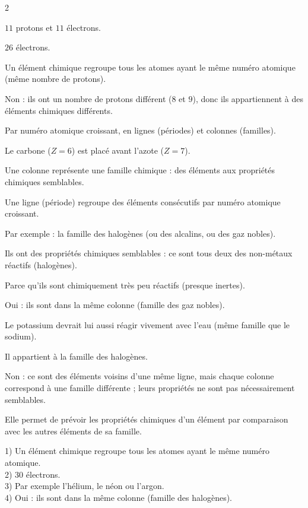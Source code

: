 \begin{multicols}{2}

$11$ protons et $11$ électrons.

$26$ électrons.

Un élément chimique regroupe tous les atomes ayant le même numéro atomique (même nombre
de protons).

Non : ils ont un nombre de protons différent ($8$ et $9$), donc ils appartiennent à des
éléments chimiques différents.

Par numéro atomique croissant, en lignes (périodes) et colonnes (familles).

Le carbone ($Z=6$) est placé avant l'azote ($Z=7$).

Une colonne représente une famille chimique : des éléments aux propriétés chimiques
semblables.

Une ligne (période) regroupe des éléments consécutifs par numéro atomique croissant.

Par exemple : la famille des halogènes (ou des alcalins, ou des gaz nobles).

Ils ont des propriétés chimiques semblables : ce sont tous deux des non-métaux réactifs
(halogènes).

Parce qu'ils sont chimiquement très peu réactifs (presque inertes).

Oui : ils sont dans la même colonne (famille des gaz nobles).

Le potassium devrait lui aussi réagir vivement avec l'eau (même famille que le sodium).

Il appartient à la famille des halogènes.

Non : ce sont des éléments voisins d'une même ligne, mais chaque colonne correspond à une
famille différente ; leurs propriétés ne sont pas nécessairement semblables.

Elle permet de prévoir les propriétés chimiques d'un élément par comparaison avec les
autres éléments de sa famille.

1) Un élément chimique regroupe tous les atomes ayant le même numéro atomique.\\
2) $30$ électrons.\\
3) Par exemple l'hélium, le néon ou l'argon.\\
4) Oui : ils sont dans la même colonne (famille des halogènes).


\end{multicols}
